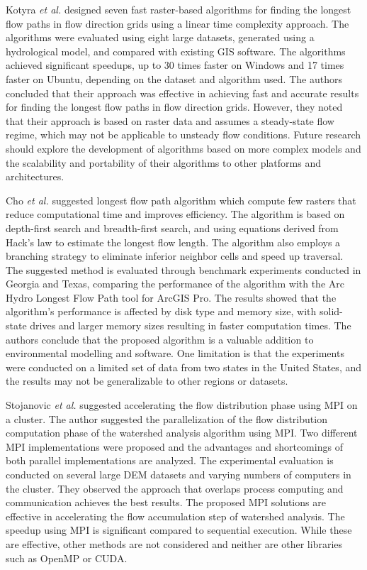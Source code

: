 \documentclass[journal, a4paper]{IEEEtran}
\begin{document}
	Kotyra \textit{et al.} \cite{KOTYRA2023105728} designed seven fast raster-based algorithms for finding the longest flow paths in flow direction grids using a linear time complexity approach. The algorithms were evaluated using eight large datasets, generated using a hydrological model, and compared with existing GIS software. The algorithms achieved significant speedups, up to 30 times faster on Windows and 17 times faster on Ubuntu, depending on the dataset and algorithm used. The authors concluded that their approach was effective in achieving fast and accurate results for finding the longest flow paths in flow direction grids. However, they noted that their approach is based on raster data and assumes a steady-state flow regime, which may not be applicable to unsteady flow conditions. Future research should explore the development of algorithms based on more complex models and the scalability and portability of their algorithms to other platforms and architectures.
	
	Cho \textit{et al.} \cite{CHO2020104774} suggested longest flow path algorithm which compute few rasters that reduce computational time and improves efficiency. The algorithm is based on depth-first search and breadth-first search, and using equations derived from Hack's law to estimate the longest flow length. The algorithm also employs a branching strategy to eliminate inferior neighbor cells and speed up traversal. The suggested method is evaluated through benchmark experiments conducted in Georgia and Texas, comparing the performance of the algorithm with the Arc Hydro Longest Flow Path tool for ArcGIS Pro. The results showed that the algorithm's performance is affected by disk type and memory size, with solid-state drives and larger memory sizes resulting in faster computation times. The authors conclude that the proposed algorithm is a valuable addition to environmental modelling and software. One limitation is that the experiments were conducted on a limited set of data from two states in the United States, and the results may not be generalizable to other regions or datasets. 

	Stojanovic \textit{et al.} \cite{stojanovic2020accelerating} suggested accelerating the flow distribution phase using MPI on a cluster. The author suggested the parallelization of the flow distribution computation phase of the watershed analysis algorithm using MPI. Two different MPI implementations were proposed and the advantages and shortcomings of both parallel implementations	are analyzed. The experimental evaluation is conducted on several large DEM datasets and varying numbers of computers in the cluster. They observed the approach that overlaps process computing and communication achieves the best results. The proposed MPI solutions are effective in accelerating the flow accumulation step of watershed analysis. The speedup using MPI is significant compared to sequential execution. While these are effective, other methods are not considered and neither are other libraries such as OpenMP or CUDA.
	
\end{document}
